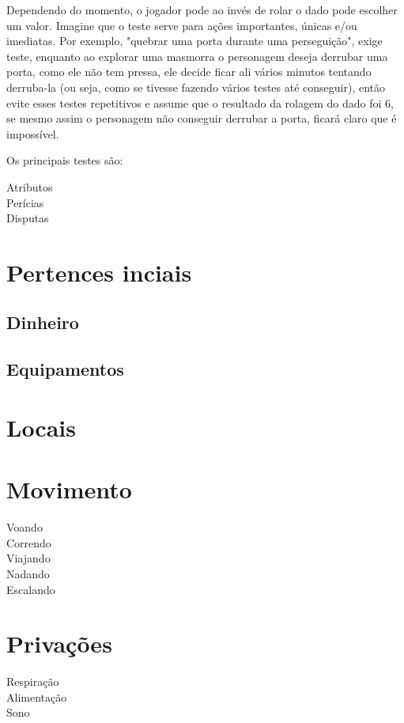 Dependendo do momento, o jogador pode ao invés de rolar o dado pode escolher um valor. Imagine que o teste serve para ações importantes, únicas e/ou imediatas. Por exemplo, "quebrar uma porta durante uma perseguição", exige teste, enquanto ao explorar uma masmorra o personagem deseja derrubar uma porta, como ele não tem pressa, ele decide ficar ali vários minutos tentando derruba-la (ou seja, como se tivesse fazendo vários testes até conseguir), então evite esses testes repetitivos e assume que o resultado da rolagem do dado foi 6, se mesmo assim o personagem não conseguir derrubar a porta, ficará claro que é impossível.

Os principais testes são:

\begin{description}
\item[Atributos]
\item[Perícias]
\item[Disputas]
\end{description}

\section{Pertences inciais}
\subsection{Dinheiro}
\subsection{Equipamentos}

\section{Locais}

\section{Movimento}
\begin{description}
\item[Voando]
\item[Correndo]
\item[Viajando]
\item[Nadando]
\item[Escalando]
\end{description}

\section{Privações}
\begin{description}
\item[Respiração]
\item[Alimentação]
\item[Sono]
\end{description}
